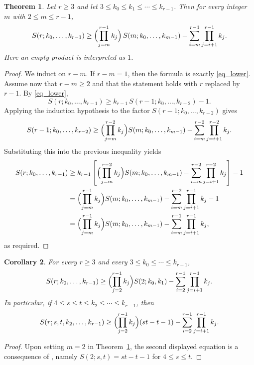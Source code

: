 \documentclass[twoside, 12pt]{article}
\newtheorem{theorem}{Theorem}
\newtheorem{corollary}[theorem]{Corollary}
\begin{document}
\begin{theorem}\label{th:iterated-recursive-lower}
Let $r\ge 3$ and let $3\le k_0\le k_1\le \cdots \le k_{r-1}$.  Then for every integer $m$ with
$2\le m\le r-1$,
\[
S(r;k_0,\dots,k_{r-1})
\ge
\Bigl(\prod_{j=m}^{r-1}k_j\Bigr)\,S(m;k_0,\dots,k_{m-1})
-\sum_{i=m}^{r-1}\prod_{j=i+1}^{r-1}k_j.
\]
Here an empty product is interpreted as $1$.
\end{theorem}

\begin{proof}
We induct on $r-m$.  If $r-m=1$, then the formula is exactly \eqref{eq_lower}.
Assume now that $r-m\ge 2$ and that the statement holds with $r$ replaced by $r-1$.
By \eqref{eq_lower},
\[
S(r;k_0,\dots,k_{r-1})\ge k_{r-1}\,S(r-1;k_0,\dots,k_{r-2})-1.
\]
Applying the induction hypothesis to the factor $S(r-1;k_0,\dots,k_{r-2})$ gives
\[
S(r-1;k_0,\dots,k_{r-2})
\ge
\Bigl(\prod_{j=m}^{r-2}k_j\Bigr)S(m;k_0,\dots,k_{m-1})
-\sum_{i=m}^{r-2}\prod_{j=i+1}^{r-2}k_j.
\]
Substituting this into the previous inequality yields
\[
\begin{aligned}
S(r;k_0,\dots,k_{r-1})
&\ge k_{r-1}\left[
\Bigl(\prod_{j=m}^{r-2}k_j\Bigr)S(m;k_0,\dots,k_{m-1})
-\sum_{i=m}^{r-2}\prod_{j=i+1}^{r-2}k_j
\right]-1\\
&=
\Bigl(\prod_{j=m}^{r-1}k_j\Bigr)S(m;k_0,\dots,k_{m-1})
-\sum_{i=m}^{r-2}\prod_{j=i+1}^{r-1}k_j-1\\
&=
\Bigl(\prod_{j=m}^{r-1}k_j\Bigr)S(m;k_0,\dots,k_{m-1})
-\sum_{i=m}^{r-1}\prod_{j=i+1}^{r-1}k_j,
\end{aligned}
\]
as required.
\end{proof}


\begin{corollary}\label{cor:iterated-from-two-color}
For every $r\ge 3$ and every $3\le k_0\le \cdots \le k_{r-1}$,
\[
S(r;k_0,\dots,k_{r-1})
\ge
\Bigl(\prod_{j=2}^{r-1}k_j\Bigr)S(2;k_0,k_1)
-\sum_{i=2}^{r-1}\prod_{j=i+1}^{r-1}k_j.
\]
In particular, if $4\le s\le t\le k_2\le \cdots \le k_{r-1}$, then
\[
S(r;s,t,k_2,\dots,k_{r-1})
\ge
\Bigl(\prod_{j=2}^{r-1}k_j\Bigr)(st-t-1)
-\sum_{i=2}^{r-1}\prod_{j=i+1}^{r-1}k_j.
\]
\end{corollary}

\begin{proof}
Upon setting $m=2$ in Theorem~\ref{th:iterated-recursive-lower}, the second displayed equation is a consequence of \cite{RobertsonSchaal01}, namely
$S(2;s,t)=st-t-1$ for $4\le s\le t.$
\end{proof}
\end{document}
